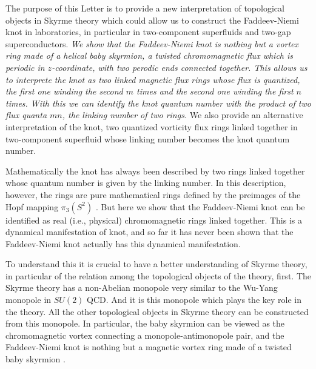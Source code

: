 \documentclass[twocolumn,showpacs,showkeys]{revtex4}
\begin{document}
The purpose of this Letter is to provide a new interpretation
of topological objects in Skyrme theory
which could allow us to construct
the Faddeev-Niemi knot in laboratories,
in particular in two-component superfluids and
two-gap superconductors.
{\it We show that the Faddeev-Niemi knot is nothing but
a vortex ring made of a helical baby skyrmion, a twisted
chromomagnetic flux which is periodic
in $z$-coordinate, with two perodic ends
connected together.
This allows us to interprete the knot as two linked
magnetic flux rings whose flux is quantized, the first one
winding the second $m$ times and the second one winding the first
$n$ times. With this we can identify
the knot quantum number
with the product of two flux quanta
$mn$, the linking number of two rings.}
We also provide an alternative interpretation of the knot,
two quantized vorticity flux rings
linked together in two-component superfluid
whose linking number becomes the knot
quantum number.

Mathematically the knot has always been described by two rings
linked together whose quantum number is given by the linking number.
In this description, however, the rings are pure mathematical 
rings defined by the preimages of the Hopf mapping 
$\pi_3(S^2)$ \cite{fadd1}. But here we show that the Faddeev-Niemi 
knot can be identified as real (i.e., physical) chromomagnetic rings linked 
together. This is a dynamical manifestation of knot, and so far 
it has never been shown that the Faddeev-Niemi knot actually has 
this dynamical manifestation. 

To understand this it is crucial to have a better understanding
of Skyrme theory, in particular of the relation among
the topological objects of the theory, first.
The Skyrme theory has a non-Abelian monopole
very similar to the Wu-Yang monopole in $SU(2)$ QCD.
And it is this monopole which plays the key role
in the theory. All the other topological objects in Skyrme theory
can be constructed
from this monopole. In particular, the baby skyrmion can be
viewed as the chromomagnetic vortex connecting
a monopole-antimonopole pair, and the Faddeev-Niemi
knot is nothing but a magnetic vortex ring made of a
twisted baby skyrmion \cite{cho01,cho02}.
\end{document}
